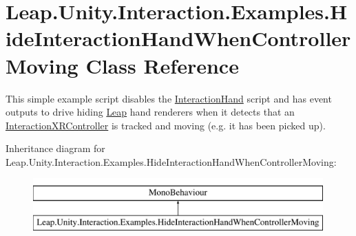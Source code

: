\hypertarget{class_leap_1_1_unity_1_1_interaction_1_1_examples_1_1_hide_interaction_hand_when_controller_moving}{}\section{Leap.\+Unity.\+Interaction.\+Examples.\+Hide\+Interaction\+Hand\+When\+Controller\+Moving Class Reference}
\label{class_leap_1_1_unity_1_1_interaction_1_1_examples_1_1_hide_interaction_hand_when_controller_moving}


This simple example script disables the \mbox{\hyperlink{class_leap_1_1_unity_1_1_interaction_1_1_interaction_hand}{Interaction\+Hand}} script and has event outputs to drive hiding \mbox{\hyperlink{namespace_leap_1_1_unity_1_1_leap}{Leap}} hand renderers when it detects that an \mbox{\hyperlink{class_leap_1_1_unity_1_1_interaction_1_1_interaction_x_r_controller}{Interaction\+X\+R\+Controller}} is tracked and moving (e.\+g. it has been picked up).  


Inheritance diagram for Leap.\+Unity.\+Interaction.\+Examples.\+Hide\+Interaction\+Hand\+When\+Controller\+Moving\+:\begin{figure}[H]
\begin{center}
\leavevmode
\includegraphics[height=2.000000cm]{class_leap_1_1_unity_1_1_interaction_1_1_examples_1_1_hide_interaction_hand_when_controller_moving}
\end{center}
\end{figure}
